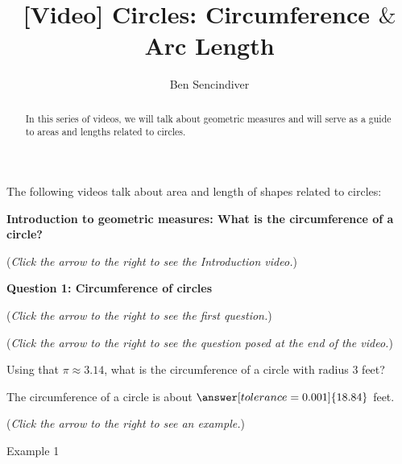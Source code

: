 \documentclass{ximera}
\title[Prerequisite Videos: ]{[Video] Circles: Circumference $\&$ Arc Length}
\author{Ben Sencindiver}
\begin{document}
\begin{abstract}
  In this series of videos, we will talk about geometric measures and will
  serve as a guide to areas and lengths related to circles. 
\end{abstract}
\maketitle

The following videos talk about area and length of shapes related to circles:

\textbf{Introduction to geometric measures: What is the circumference
of a circle?}
\begin{explanation}
\begin{flushright}
{\color{blue}(\emph{Click the arrow to the right to see the Introduction video.})}
\end{flushright}
\begin{center}
\begin{expandable}
\end{expandable}
\end{center}
\end{explanation}

\textbf{Question 1: Circumference of circles}
\begin{question}
\begin{flushright}
{\color{blue}(\emph{Click the arrow to the right to see the first question.})}
\end{flushright}
\begin{center}
\begin{expandable}
\begin{flushright}
{\color{blue}(\emph{Click the arrow to the right to see the question
posed at the end of the video.})}
\end{flushright}
\begin{expandable}
Using that $\pi\approx 3.14$, what is the circumference of a circle with radius $3$ feet?\\
\begin{prompt}
The circumference of a circle is about $\answer[tolerance=0.001]{18.84}$ feet.
\end{prompt}
\begin{flushright}
{\color{blue}(\emph{Click the arrow to the right to see an example.})}
\end{flushright}
\begin{expandable}
\begin{center}
Example 1
\end{center}
\end{expandable}
\end{expandable}
\end{expandable}
\end{center}
\end{question}
\end{document}
